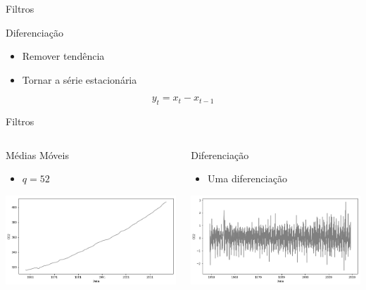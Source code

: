 \documentclass[compress,aspectratio=149,brazil]{beamer}
\begin{document}
\begin{frame}{Filtros}
    \begin{block}{Diferenciação}
        \begin{itemize}
            \item Remover tendência
            \item Tornar a série estacionária
        \end{itemize}
        \[
            y_t = x_t - x_{t-1}
        \]
    \end{block}
\end{frame}

\begin{frame}{Filtros}
    \begin{columns}
        \begin{column}{.5\textwidth}
            \begin{block}{Médias Móveis}
                \begin{itemize}
                    \item $q = 52$
                \end{itemize}
                \includegraphics[width=\textwidth]{../images/co2_filtered.png}
            \end{block}
        \end{column}
        \begin{column}{.5\textwidth}
            \begin{block}{Diferenciação}
                \begin{itemize}
                    \item Uma diferenciação
                \end{itemize}
                \includegraphics[width=\textwidth]{../images/co2_diff.png}

\end{block}
\end{column}
\end{columns}
\end{frame}
\end{document}
